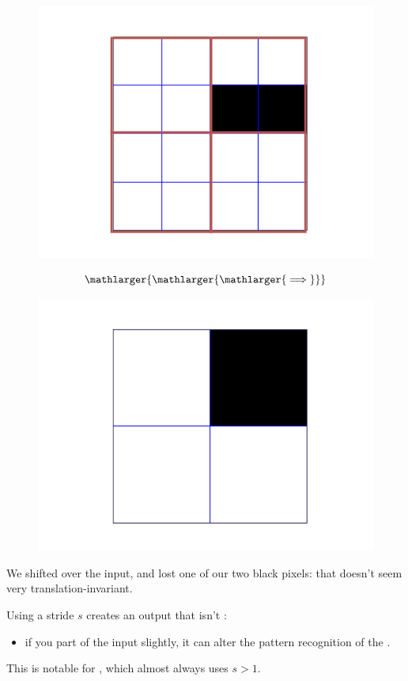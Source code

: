         \begin{figure}[ht]
            \begin{minipage}{.35\textwidth}
              \centering
              \includegraphics[width=.6\linewidth]{images/convolutional_neural_networks_images/maxpool_right.png}
            \end{minipage}
            \begin{minipage}{.1\textwidth}
                \centering
                $$\mathlarger{\mathlarger{\mathlarger{\implies}}}$$
            \end{minipage}
            \begin{minipage}{.35\textwidth}
              \centering
              \includegraphics[width=.6\linewidth]{images/convolutional_neural_networks_images/right_maxpooled.png}
            \end{minipage}
        \end{figure}

        We shifted over the input, and lost one of our two black pixels: that doesn't seem very translation-invariant.\\

        \begin{concept}
            Using a stride $s$  creates an output that isn't : 
            
            \begin{itemize}
                \item if you  part of the input slightly, it can alter the pattern recognition of the .
            \end{itemize}

            This is notable for , which almost always uses $s>1$. 
        \end{concept}

